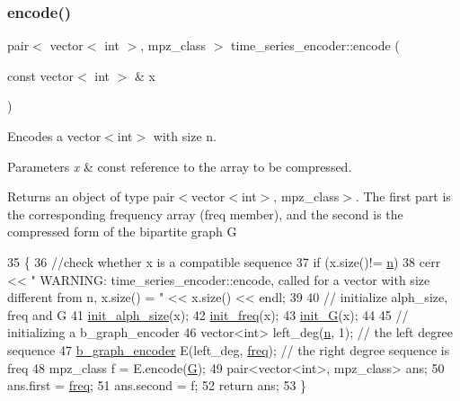 \subsubsection{\texorpdfstring{encode()}{encode()}}
{\footnotesize\ttfamily pair$<$ vector$<$ int $>$, mpz\+\_\+class $>$ time\+\_\+series\+\_\+encoder\+::encode (\begin{DoxyParamCaption}\item[{const vector$<$ int $>$ \&}]{x }\end{DoxyParamCaption})}



Encodes a {\ttfamily vector$<$int$>$} with size n. 


\begin{DoxyParams}{Parameters}
{\em x} & const reference to the array to be compressed. \\
\hline
\end{DoxyParams}
\begin{DoxyReturn}{Returns}
an object of type {\ttfamily pair$<$vector$<$int$>$, mpz\+\_\+class$>$}. The first part is the corresponding frequency array ({\ttfamily freq} member), and the second is the compressed form of the bipartite graph G 
\end{DoxyReturn}

\begin{DoxyCode}
35 \{
36   \textcolor{comment}{//check whether x is a compatible sequence}
37   \textcolor{keywordflow}{if} (x.size()!= \hyperlink{classtime__series__encoder_ab84b7528d50c495fc140f1eb50d9b539}{n})
38     cerr << \textcolor{stringliteral}{" WARNING: time\_series\_encoder::encode, called for a vector with size different from n,
       x.size() = "} << x.size() << endl;
39 
40   \textcolor{comment}{// initialize alph\_size, freq and G}
41   \hyperlink{classtime__series__encoder_a8607e6953e5115a3c8a198266d2db8ce}{init\_alph\_size}(x);
42   \hyperlink{classtime__series__encoder_af4b8988acb10fe076be59302e47084be}{init\_freq}(x);
43   \hyperlink{classtime__series__encoder_a90eb54134d6af2ab2cca36ee13956470}{init\_G}(x);
44   
45   \textcolor{comment}{// initializing a b\_graph\_encoder}
46   vector<int> left\_deg(\hyperlink{classtime__series__encoder_ab84b7528d50c495fc140f1eb50d9b539}{n}, 1); \textcolor{comment}{// the left degree sequence}
47   \hyperlink{classb__graph__encoder}{b\_graph\_encoder} E(left\_deg, \hyperlink{classtime__series__encoder_ac6496aa39f28da4d8fe964c495e76057}{freq}); \textcolor{comment}{// the right degree sequence is freq}
48   mpz\_class f = E.encode(\hyperlink{classtime__series__encoder_aa40f761a56f696e78e8888e50e8f45b9}{G});
49   pair<vector<int>, mpz\_class> ans;
50   ans.first = \hyperlink{classtime__series__encoder_ac6496aa39f28da4d8fe964c495e76057}{freq};
51   ans.second  = f;
52   \textcolor{keywordflow}{return} ans;
53 \}
\end{DoxyCode}
\mbox{\label{classtime__series__encoder_a8607e6953e5115a3c8a198266d2db8ce}} 
